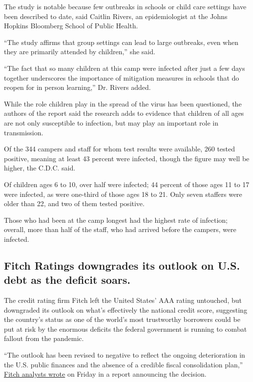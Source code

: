 The study is notable because few outbreaks in schools or child care
settings have been described to date, said Caitlin Rivers, an
epidemiologist at the Johns Hopkins Bloomberg School of Public Health.

``The study affirms that group settings can lead to large outbreaks,
even when they are primarily attended by children,'' she said.

``The fact that so many children at this camp were infected after just a
few days together underscores the importance of mitigation measures in
schools that do reopen for in person learning,'' Dr. Rivers added.

While the role children play in the spread of the virus has been
questioned, the authors of the report said the research adds to evidence
that children of all ages are not only susceptible to infection, but may
play an important role in transmission.

Of the 344 campers and staff for whom test results were available, 260
tested positive, meaning at least 43 percent were infected, though the
figure may well be higher, the C.D.C. said.

Of children ages 6 to 10, over half were infected; 44 percent of those
ages 11 to 17 were infected, as were one-third of those ages 18 to 21.
Only seven staffers were older than 22, and two of them tested positive.

Those who had been at the camp longest had the highest rate of
infection; overall, more than half of the staff, who had arrived before
the campers, were infected.

\hypertarget{fitch-ratings-downgrades-its-outlook-on-us-debt-as-the-deficit-soars}{%
\subsection{Fitch Ratings downgrades its outlook on U.S. debt as the
deficit
soars.}\label{fitch-ratings-downgrades-its-outlook-on-us-debt-as-the-deficit-soars}}

The credit rating firm Fitch left the United States' AAA rating
untouched, but downgraded its outlook on what's effectively the national
credit score, suggesting the country's status as one of the world's most
trustworthy borrowers could be put at risk by the enormous deficits the
federal government is running to combat fallout from the pandemic.

``The outlook has been revised to negative to reflect the ongoing
deterioration in the U.S. public finances and the absence of a credible
fiscal consolidation plan,''
\href{https://www.fitchratings.com/research/sovereigns/fitch-revises-united-states-outlook-to-negative-affirms-at-aaa-31-07-2020}{Fitch
analysts wrote} on Friday in a report announcing the decision.

